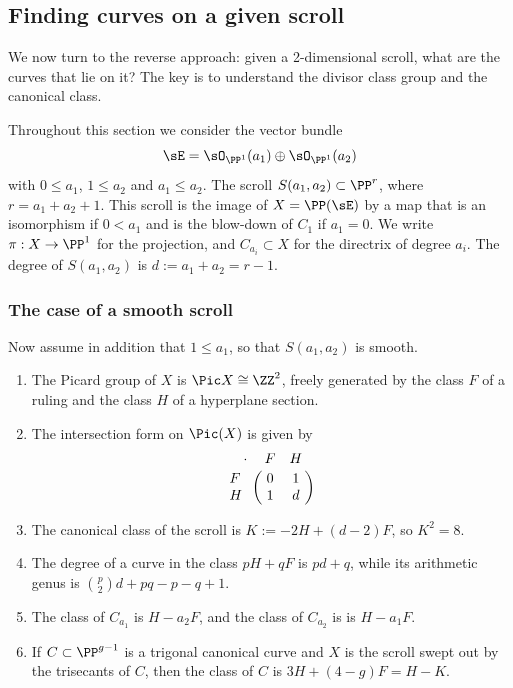\subsection{Finding curves on a given scroll}

We now turn to the reverse approach: given a 2-dimensional scroll, what are the curves that lie on it?
The key is to understand the divisor class group and the canonical class.

 Throughout this section we consider the vector bundle 
$$
\sE = \sO_{\PP^1}(a_1) \oplus\sO_{\PP^1}(a_2)
$$
with  $0\leq a_1$, $1\leq a_2$ and  $a_{1}\leq a_{2}$. The 
scroll $ S(a_1, a_2) \subset \PP^r$, where $r= a_1+a_2+1$. This scroll is the image of $X = \PP(\sE)$ by a map that is an isomorphism
if $0<a_1$ and is the blow-down of  $C_1$ if $a_1=0$.  We write $\pi:X \to \PP^1$ for the projection, and
$C_{a_i}\subset X$ for the directrix of degree $a_i$. The degree of $S(a_1,a_2)$ is $d := a_1+a_2 = r-1$.

 \subsubsection{The case of a  smooth scroll}

Now assume in addition that $1\leq a_{1}$, so that $S(a_{1}, a_{2})$ is smooth.

\begin{theorem}\label{pic of scroll}

\begin{enumerate}

\item The Picard group of $X$ is $\Pic X \cong \ZZ^2$, freely generated by  the class $F$ of a ruling and the class $H$ of a  hyperplane section. 
\item The
intersection form on $\Pic(X)$ is given by
$$
\bordermatrix{\kern 10pt\cdot&F&H\cr
F&0&1\cr
H&1&d
}
$$

\item The canonical class of the scroll is $K := -2H +(d-2)F$, so $K^2 = 8$.

\item The degree of a curve in the class $pH+qF$ is $pd+q$, while its arithmetic genus is
${p\choose 2}d+pq-p-q+1$.

\item The class of $C_{a_1}$
is $H-a_2F$, and the class of $C_{a_2}$ is 
is $H-a_1F$. 
\item If $C \subset \PP^{g-1}$ is a trigonal canonical curve and $X$ is the scroll swept out by the trisecants of $C$, then the class of $C$ is $3H+(4-g)F = H-K$. 
\end{enumerate}
\end{theorem}

